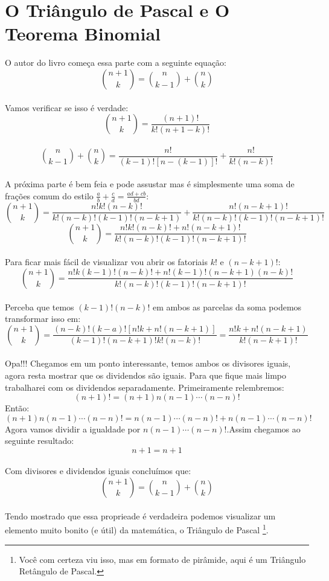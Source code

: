 \documentclass[a4paper,11pt]{book}
\theoremstyle{definition}
\theoremstyle{break}
\begin{document}
\section{O Triângulo de Pascal e O Teorema Binomial}
O autor do livro começa essa parte com a seguinte equação:
\\
$$ {n+1 \choose k} = {n \choose k-1} + {n \choose k} $$
\\
Vamos verificar se isso é verdade:
$$ {n+1 \choose k} = \frac{(n+1)!}{k!(n+1-k)!}$$
\\
$${n \choose k-1} + {n \choose k} = \frac{n!}{(k-1)![n-(k-1)]!} + \frac{n!}{k!(n-k)!}$$
\\
A próxima parte é bem feia e pode assustar mas é simplesmente uma soma de frações comum do estilo $\frac{a}{b} + \frac{c}{d} = \frac{ad+cb}{bd}$:
$${n+1 \choose k} = \frac{n!k!(n-k)!}{k!(n-k)!(k-1)!(n-k+1)} + \frac{n!(n-k+1)!}{k!(n-k)!(k-1)!(n-k+1)!}$$
$${n+1 \choose k} = \frac{n!k!(n-k)! + n!(n-k+1)!}{k!(n-k)!(k-1)!(n-k+1)!}$$
\\
Para ficar mais fácil de visualizar vou abrir os fatoriais $k!$ e $(n-k+1)!$:
$${n+1 \choose k} = \frac{n!k(k-1)!(n-k)! + n!(k-1)!(n-k+1)(n-k)!}{k!(n-k)!(k-1)!(n-k+1)!}$$
\\
Perceba que temos $(k-1)!(n-k)!$ em ambos as parcelas da soma podemos transformar isso em:
\\
$${n+1 \choose k} = \frac{(n-k)!(k-a)![n!k+n!(n-k+1)]}{(k-1)!(n-k+1)!k!(n-k)!} = \frac{n!k + n!(n-k+1)}{k!(n-k+1)!}$$
\\
Opa!!! Chegamos em um ponto interessante, temos ambos os divisores iguais, agora resta mostrar que os dividendos são iguais. Para que fique mais limpo trabalharei com os dividendos separadamente. Primeiramente relembremos:
\\
$$(n+1)! = (n+1)n(n-1)\cdots(n-n)!$$
Então:
$$(n+1)n(n-1)\cdots(n-n)! = n(n-1)\cdots(n-n)! + n(n-1)\cdots(n-n)!$$
Agora vamos dividir a igualdade por $n(n-1)\cdots(n-n)!$.Assim chegamos ao seguinte resultado:
$$n+1 = n+1$$
\\
Com divisores e dividendos iguais concluímos que:
$$ {n+1 \choose k} = {n \choose k-1} + {n \choose k} $$
\\
Tendo mostrado que essa proprieade é verdadeira podemos visualizar um elemento muito bonito (e útil) da matemática, o Triângulo de Pascal \footnote{Você com certeza viu isso, mas em formato de pirâmide, aqui é um Triângulo Retângulo de Pascal.}.
\\
\end{document}
